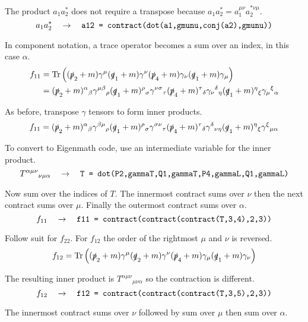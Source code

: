 \documentclass[12pt]{article}
\begin{document}
The product $a_1a_2^*$ does not require a transpose because $a_1a_2^*=a_1^{\mu\nu}a_2^{*\nu\mu}$.
\begin{equation*}
a_1a_2^*
\quad\rightarrow\quad
\text{\tt a12 = contract(dot(a1,gmunu,conj(a2),gmunu))}
\end{equation*}

In component notation, a trace operator becomes a sum over an index, in this case $\alpha$.
\begin{align*}
f_{11}
&=
\mathop{\rm Tr}
\left(
(\slashed{p}_2+m)\gamma^\mu(\slashed{q}_1+m)\gamma^\nu(\slashed{p}_4+m)\gamma_\nu(\slashed{q}_1+m)\gamma_\mu
\right)\\
&=
(\slashed{p}_2+m)^\alpha{}_\beta
\gamma^{\mu\beta}{}_\rho
(\slashed{q}_1+m)^\rho{}_\sigma
\gamma^{\nu\sigma}{}_\tau
(\slashed{p}_4+m)^\tau{}_\delta
\gamma_\nu{}^\delta{}_\eta
(\slashed{q}_1+m)^\eta{}_\xi
\gamma_\mu{}^\xi{}_\alpha
\end{align*}

As before, transpose $\gamma$ tensors to form inner products.
\begin{equation*}
f_{11}=
(\slashed{p}_2+m)^\alpha{}_\beta
\gamma^{\beta\mu}{}_\rho
(\slashed{q}_1+m)^\rho{}_\sigma
\gamma^{\sigma\nu}{}_\tau
(\slashed{p}_4+m)^\tau{}_\delta
\gamma^\delta{}_{\nu\eta}
(\slashed{q}_1+m)^\eta{}_\xi
\gamma^\xi{}_{\mu\alpha}
\end{equation*}

To convert to Eigenmath code, use an intermediate variable for the inner product.
\begin{equation*}
T^{\alpha\mu\nu}{}_{\nu\mu\alpha}
\quad\rightarrow\quad
\text{\tt T = dot(P2,gammaT,Q1,gammaT,P4,gammaL,Q1,gammaL)}
\end{equation*}

Now sum over the indices of $T$.
The innermost contract sums over $\nu$ then the next contract sums over $\mu$.
Finally the outermost contract sums over $\alpha$.
\begin{equation*}
f_{11}\quad\rightarrow\quad
\text{\tt f11 = contract(contract(contract(T,3,4),2,3))}
\end{equation*}

Follow suit for $f_{22}$.
For $f_{12}$ the order of the rightmost $\mu$ and $\nu$ is reversed.
\begin{equation*}
f_{12}=\mathop{\rm Tr}
\left(
(\slashed{p}_2+m)\gamma^\mu(\slashed{q}_2+m)\gamma^\nu(\slashed{p}_4+m)\gamma_\mu(\slashed{q}_1+m)\gamma_\nu
\right)
\end{equation*}

The resulting inner product is $T^{\alpha\mu\nu}{}_{\mu\nu\alpha}$
so the contraction is different.
\begin{equation*}
f_{12}
\quad\rightarrow\quad
\text{\tt f12 = contract(contract(contract(T,3,5),2,3))}
\end{equation*}

The innermost contract sums over $\nu$ followed by sum over $\mu$ then sum over $\alpha$.
\end{document}
